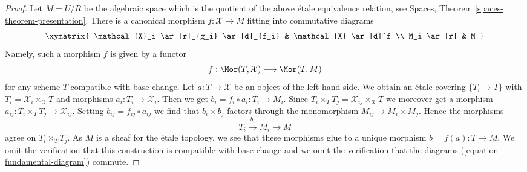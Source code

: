 \begin{proof}
\medskip\noindent
Let $M = U/R$ be the algebraic space which is the quotient of the above
\'etale equivalence relation, see
Spaces, Theorem \ref{spaces-theorem-presentation}.
There is a canonical morphism $f : \mathcal{X} \to M$
fitting into commutative diagrams
\begin{equation}
\label{equation-fundamental-diagram}
\xymatrix{
\mathcal{X}_i \ar[r]_{g_i} \ar[d]_{f_i} & \mathcal{X} \ar[d]^f \\
M_i \ar[r] & M
}
\end{equation}
Namely, such a morphism $f$ is given by a functor
$$
f : \Mor(T, \mathcal{X}) \longrightarrow \Mor(T, M)
$$
for any scheme $T$ compatible with base change. Let $a : T \to \mathcal{X}$
be an object of the left hand side. We obtain an \'etale covering
$\{T_i \to T\}$ with $T_i = \mathcal{X}_i \times_\mathcal{X} T$
and morphisms $a_i : T_i \to \mathcal{X}_i$. Then we get
$b_i = f_i \circ a_i : T_i \to M_i$. Since
$T_i \times_T T_j = \mathcal{X}_{ij} \times_\mathcal{X} T$
we moreover get a morphism $a_{ij} : T_i \times_T T_j \to \mathcal{X}_{ij}$.
Setting $b_{ij} = f_{ij} \circ a_{ij}$ we find that
$b_i \times b_j$ factors through the monomorphism
$M_{ij} \to M_i \times M_j$. Hence the morphisms
$$
T_i \xrightarrow{b_i} M_i \to M
$$
agree on $T_i \times_T T_j$. As $M$ is a sheaf for the \'etale
topology, we see that these morphisms glue to a unique
morphism $b = f(a) : T \to M$. We omit the verification that
this construction is compatible with base change and we omit
the verification that the diagrams
(\ref{equation-fundamental-diagram}) commute.


\end{proof}
